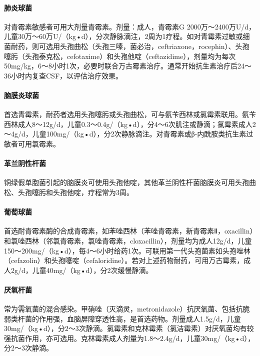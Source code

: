 \paragraph{肺炎球菌}

对青霉素敏感者可用大剂量青霉素。剂量：成人，青霉素G
2000万～2400万U/d，儿童30万～60万U/（kg•d），分次静脉滴注，2周为1疗程。如对青霉素过敏或细菌耐药，则可选用头孢曲松（头孢三嗪，菌必治，ceftriaxone，rocephin）、头孢噻肟（头孢泰克松，cefotaxime）和头孢他啶（ceftazidime），剂量均为每次50mg/kg，6～8小时1次，必要时联合万古霉素治疗。通常开始抗生素治疗后24～36小时内复查CSF，以评估治疗效果。

\paragraph{脑膜炎球菌}

首选青霉素，耐药者选用头孢噻肟或头孢曲松，可与氨苄西林或氯霉素联用。氨苄西林成人8～12g/d，儿童0.3～0.4g/（kg•d），分4～6次肌注或静滴；氯霉素成人2～4g/d，儿童100mg/（kg•d），分2次静脉滴注。对青霉素或β-内酰胺类抗生素过敏者可用氯霉素。

\paragraph{革兰阴性杆菌}

铜绿假单胞菌引起的脑膜炎可使用头孢他啶，其他革兰阴性杆菌脑膜炎可用头孢曲松、头孢噻肟和头孢他啶，疗程常为3周。

\paragraph{葡萄球菌}

首选耐青霉素酶的合成青霉素，如苯唑西林（苯唑青霉素，新青霉素Ⅱ，oxacillin）和氯唑西林（邻氯青霉素，氯唑青霉素，cloxacillin），剂量均为成人12g/d，儿童150～200mg/（kg•d），每4～6小时给药1次。可联用第一代头孢菌素如头孢唑林（cefazolin）和头孢噻啶（cefaloridine）。若对上述药物耐药，可用万古霉素，成人2g/d，儿童40mg/（kg•d），分2次缓慢静滴。

\paragraph{厌氧杆菌}

常为需氧菌的混合感染。甲硝唑（灭滴灵，metronidazole）抗厌氧菌、包括抗脆弱类杆菌的作用强，血脑屏障穿透性高，是首选药物。剂量成人1.5g/d，儿童30mg/（kg•d），分2～3次静滴。氯霉素和克林霉素（氯洁霉素）对厌氧菌均有较强抗菌作用，亦可选用。克林霉素成人剂量为1.8～2.4g/d，儿童30mg/（kg•d），分2～3次静滴。

